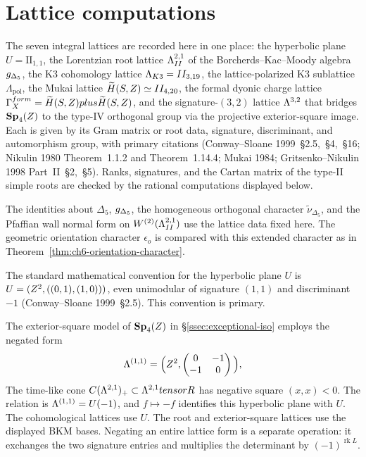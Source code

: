 \section{Lattice computations}
\label{app:lattices}

The seven integral lattices are recorded here in one place: the
hyperbolic plane $U=\mathrm{II}_{1,1}$, the Lorentzian
root lattice $\Lambda_{II}^{2,1}$ of the Borcherds--Kac--Moody algebra
${g_{\Delta_5}}$, the K3 cohomology lattice $\Lambda_{K3}=II_{3,19}$, the
lattice-polarized K3 sublattice \(\Lambda_{\mathrm{pol}}\), the Mukai lattice
$\widetilde H(S,Z)\simeq II_{4,20}$, the formal dyonic charge
lattice
\(\Gamma_X^{form}
=\widetilde H(S,Z)plus\widetilde H(S,Z)\), and the
signature-$(3,2)$ lattice $\Lambda^{3,2}$ that bridges $\mathbf{Sp}_4(Z)$ to
the type-IV orthogonal group via the projective exterior-square image.
Each is given by
its Gram matrix or root data, signature, discriminant, and
automorphism group, with primary citations (Conway--Sloane
1999~\S2.5,~\S4,~\S16; Nikulin 1980 Theorem~1.1.2 and
Theorem~1.14.4; Mukai 1984; Gritsenko--Nikulin 1998
Part~II~\S2,~\S5).  Ranks, signatures, and the Cartan matrix of the
type-II simple roots are checked by the rational computations displayed
below.

The identities about $\Delta_5$, ${g_{\Delta_5}}$, the homogeneous orthogonal
character $\widetilde\nu_{\Delta_5}$, and the Pfaffian wall normal
form on $W^{(2)}(\Lambda_{II}^{2,1})$ use the lattice data fixed here.
The geometric orientation character $\epsilon_o$ is compared with
this extended character as in
Theorem~\ref{thm:ch6-orientation-character}.

\begin{convention}
\label{conv:lattice-signs}
The standard mathematical convention for the hyperbolic plane $U$ is
$U=(Z^2,((0,1),(1,0)))$, even unimodular of signature $(1,1)$ and
discriminant $-1$ (Conway--Sloane 1999~\S2.5).  This convention is
primary.

The exterior-square model of $\mathbf{Sp}_4(Z)$ in
\S\ref{ssec:exceptional-iso} employs the negated form
\[
\Lambda^{(1,1)}=\Big(Z^2,\begin{pmatrix}0&-1\\-1&0\end{pmatrix}\Big),
\]
The time-like cone $C(\Lambda^{2,1})_+\subset
\Lambda^{2,1}tensorR$ has negative square $(x,x)<0$.  The relation is $\Lambda^{(1,1)}=U(-1)$, and $f\mapsto-f$ identifies this
hyperbolic plane with $U$.  The cohomological lattices use $U$.
The root and exterior-square lattices use the displayed BKM bases.
Negating an entire lattice form is a separate operation: it exchanges
the two signature entries and multiplies the determinant by
$(-1)^{\operatorname{rk}L}$.
\end{convention}

